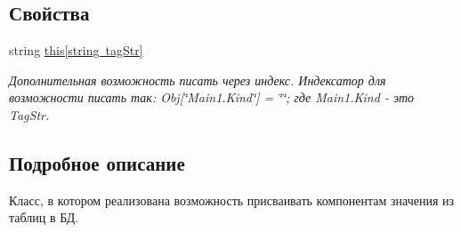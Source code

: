 \subsection*{Свойства}
\begin{DoxyCompactItemize}
\item 
string \mbox{\hyperlink{class_f_b_a_1_1_object_ref_a83b1ca9388ad3146af7147360707da55}{this\mbox{[}string tag\+Str\mbox{]}}}
\begin{DoxyCompactList}\small\item\em Дополнительная возможность писать через индекс. Индексатор для возможности писать так\+: Obj\mbox{[}\char`\"{}\+Main1.\+Kind\char`\"{}\mbox{]} = \char`\"{}\char`\"{}; где Main1.\+Kind -\/ это Tag\+Str. \end{DoxyCompactList}\end{DoxyCompactItemize}


\subsection{Подробное описание}
Класс, в котором реализована возможность присваивать компонентам значения из таблиц в БД. 

